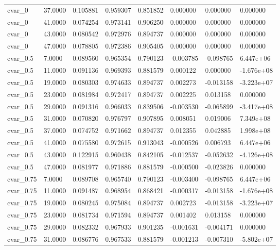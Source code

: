 \documentclass[11pt]{report}
\begin{document}
\begin{longtable}{llllllll}
cvar\_0 & 37.0000 & 0.105881 & 0.959307 & 0.851852 & 0.000000 & 0.000000 & 0.000000 \\
cvar\_0 & 41.0000 & 0.074254 & 0.973141 & 0.906250 & 0.000000 & 0.000000 & 0.000000 \\
cvar\_0 & 43.0000 & 0.080542 & 0.972976 & 0.894737 & 0.000000 & 0.000000 & 0.000000 \\
cvar\_0 & 47.0000 & 0.078805 & 0.972386 & 0.905405 & 0.000000 & 0.000000 & 0.000000 \\
cvar\_0.5 & 7.0000 & 0.089560 & 0.965354 & 0.790123 & -0.003785 & -0.098765 & 6.447e+06 \\
cvar\_0.5 & 11.0000 & 0.091136 & 0.969393 & 0.881579 & 0.000122 & 0.000000 & -1.676e+08 \\
cvar\_0.5 & 19.0000 & 0.080303 & 0.974633 & 0.894737 & 0.002273 & -0.013158 & -3.223e+07 \\
cvar\_0.5 & 23.0000 & 0.081984 & 0.972417 & 0.894737 & 0.002225 & 0.013158 & 0.000000 \\
cvar\_0.5 & 29.0000 & 0.091316 & 0.966033 & 0.839506 & -0.003530 & -0.065899 & -3.417e+08 \\
cvar\_0.5 & 31.0000 & 0.070820 & 0.976797 & 0.907895 & 0.008051 & 0.019006 & 7.349e+08 \\
cvar\_0.5 & 37.0000 & 0.074752 & 0.971662 & 0.894737 & 0.012355 & 0.042885 & 1.998e+08 \\
cvar\_0.5 & 41.0000 & 0.075580 & 0.972615 & 0.913043 & -0.000526 & 0.006793 & 6.447e+06 \\
cvar\_0.5 & 43.0000 & 0.122915 & 0.960438 & 0.842105 & -0.012537 & -0.052632 & -4.126e+08 \\
cvar\_0.5 & 47.0000 & 0.081977 & 0.971886 & 0.881579 & -0.000500 & -0.023826 & 0.000000 \\
cvar\_0.75 & 7.0000 & 0.089708 & 0.965740 & 0.790123 & -0.003400 & -0.098765 & 6.447e+06 \\
cvar\_0.75 & 11.0000 & 0.091487 & 0.968954 & 0.868421 & -0.000317 & -0.013158 & -1.676e+08 \\
cvar\_0.75 & 19.0000 & 0.080245 & 0.975084 & 0.894737 & 0.002723 & -0.013158 & -3.223e+07 \\
cvar\_0.75 & 23.0000 & 0.081734 & 0.971594 & 0.894737 & 0.001402 & 0.013158 & 0.000000 \\
cvar\_0.75 & 29.0000 & 0.082332 & 0.967933 & 0.901235 & -0.001631 & -0.004171 & 0.000000 \\
cvar\_0.75 & 31.0000 & 0.086776 & 0.967533 & 0.881579 & -0.001213 & -0.007310 & -5.802e+07 \\

\end{longtable}
\end{document}
